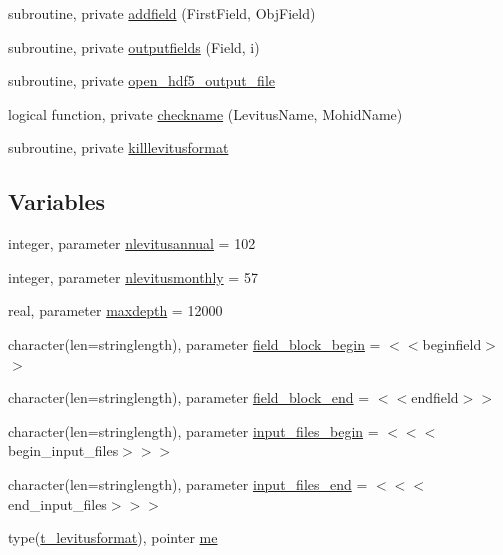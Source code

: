 \begin{DoxyCompactItemize}
subroutine, private \mbox{\hyperlink{namespacemodulelevitusformat_a37cf54f54483fb6da9fe84dbb77e0826}{addfield}} (First\+Field, Obj\+Field)
\item 
subroutine, private \mbox{\hyperlink{namespacemodulelevitusformat_aabed50c7effe5d563a35ce0013a4ec93}{outputfields}} (Field, i)
\item 
subroutine, private \mbox{\hyperlink{namespacemodulelevitusformat_a43a015e528279df64ee7b5856bb08147}{open\+\_\+hdf5\+\_\+output\+\_\+file}}
\item 
logical function, private \mbox{\hyperlink{namespacemodulelevitusformat_a0140480b31ea48c6b48c75a6944bf406}{checkname}} (Levitus\+Name, Mohid\+Name)
\item 
subroutine, private \mbox{\hyperlink{namespacemodulelevitusformat_aee602b5ad04c2069cd2ddaea3d922bf9}{killlevitusformat}}
\end{DoxyCompactItemize}
\subsection*{Variables}
\begin{DoxyCompactItemize}
\item 
integer, parameter \mbox{\hyperlink{namespacemodulelevitusformat_a3edc6e1738bc17572f3b07705f142bd4}{nlevitusannual}} = 102
\item 
integer, parameter \mbox{\hyperlink{namespacemodulelevitusformat_a64890904e5c28f0e6abc308dbe4130e7}{nlevitusmonthly}} = 57
\item 
real, parameter \mbox{\hyperlink{namespacemodulelevitusformat_a229f9d8dbe6c9ecd28b7dce69d7c6854}{maxdepth}} = 12000
\item 
character(len=stringlength), parameter \mbox{\hyperlink{namespacemodulelevitusformat_a9af934d53d17b725109ed386a7682f11}{field\+\_\+block\+\_\+begin}} = \textquotesingle{}$<$$<$beginfield$>$$>$\textquotesingle{}
\item 
character(len=stringlength), parameter \mbox{\hyperlink{namespacemodulelevitusformat_ad8c1adba13150b2f1cd175c21286c020}{field\+\_\+block\+\_\+end}} = \textquotesingle{}$<$$<$endfield$>$$>$\textquotesingle{}
\item 
character(len=stringlength), parameter \mbox{\hyperlink{namespacemodulelevitusformat_ad4ad30b5b6f7cc543e84c4be601d151e}{input\+\_\+files\+\_\+begin}} = \textquotesingle{}$<$$<$$<$begin\+\_\+input\+\_\+files$>$$>$$>$\textquotesingle{}
\item 
character(len=stringlength), parameter \mbox{\hyperlink{namespacemodulelevitusformat_a048869c603072e08395f86eedfa8e608}{input\+\_\+files\+\_\+end}} = \textquotesingle{}$<$$<$$<$end\+\_\+input\+\_\+files$>$$>$$>$\textquotesingle{}
\item 
type(\mbox{\hyperlink{structmodulelevitusformat_1_1t__levitusformat}{t\+\_\+levitusformat}}), pointer \mbox{\hyperlink{namespacemodulelevitusformat_a9c909f12809cc941f33fabebbea18d55}{me}}
\end{DoxyCompactItemize}


